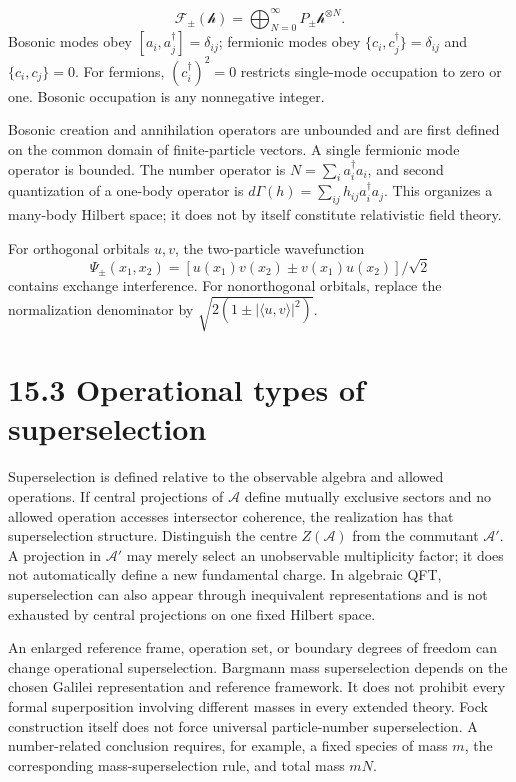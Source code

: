 \documentclass[
  11pt,
  oneside]{book}
\begin{document}
\[
\mathcal F_\pm(\mathcal h)=\bigoplus_{N=0}^\infty
P_\pm\mathcal h^{\otimes N}.
\] Bosonic modes obey \([a_i,a_j^\dagger]=\delta_{ij}\); fermionic modes
obey \(\{c_i,c_j^\dagger\}=\delta_{ij}\) and \(\{c_i,c_j\}=0\). For
fermions, \((c_i^\dagger)^2=0\) restricts single-mode occupation to zero
or one. Bosonic occupation is any nonnegative integer.

Bosonic creation and annihilation operators are unbounded and are first
defined on the common domain of finite-particle vectors. A single
fermionic mode operator is bounded. The number operator is
\(N=\sum_i a_i^\dagger a_i\), and second quantization of a one-body
operator is \(d\Gamma(h)=\sum_{ij}h_{ij}a_i^\dagger a_j\). This
organizes a many-body Hilbert space; it does not by itself constitute
relativistic field theory.

For orthogonal orbitals \(u,v\), the two-particle wavefunction \[
\Psi_\pm(x_1,x_2)=
[u(x_1)v(x_2)\pm v(x_1)u(x_2)]/\sqrt2
\] contains exchange interference. For nonorthogonal orbitals, replace
the normalization denominator by
\(\sqrt{2(1\pm|\langle u,v\rangle|^2)}\).

\section{15.3 Operational types of superselection}

Superselection is defined relative to the observable algebra and allowed
operations. If central projections of \(\mathcal A\) define mutually
exclusive sectors and no allowed operation accesses intersector
coherence, the realization has that superselection structure.
Distinguish the centre \(Z(\mathcal A)\) from the commutant
\(\mathcal A'\). A projection in \(\mathcal A'\) may merely select an
unobservable multiplicity factor; it does not automatically define a new
fundamental charge. In algebraic QFT, superselection can also appear
through inequivalent representations and is not exhausted by central
projections on one fixed Hilbert space.

An enlarged reference frame, operation set, or boundary degrees of
freedom can change operational superselection. Bargmann mass
superselection depends on the chosen Galilei representation and
reference framework. It does not prohibit every formal superposition
involving different masses in every extended theory. Fock construction
itself does not force universal particle-number superselection. A
number-related conclusion requires, for example, a fixed species of mass
\(m\), the corresponding mass-superselection rule, and total mass
\(mN\).
\end{document}
